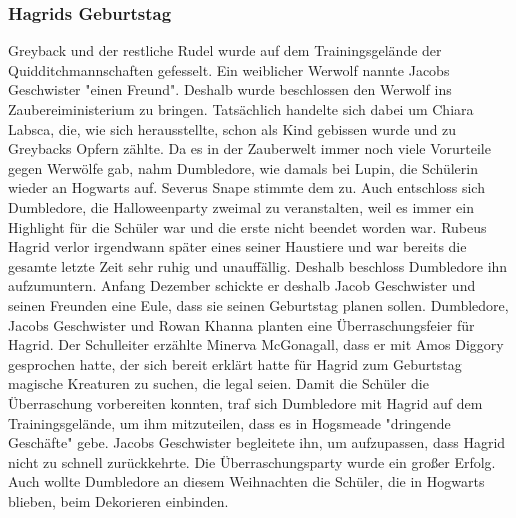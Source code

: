 \documentclass[a4paper, 10pt]{article}
\begin{document}
\subsubsection*{Hagrids Geburtstag}
Greyback und der restliche Rudel wurde auf dem Trainingsgelände der Quidditchmannschaften gefesselt. Ein weiblicher Werwolf nannte Jacobs Geschwister "einen Freund". Deshalb wurde beschlossen den Werwolf ins Zaubereiministerium zu bringen. Tatsächlich handelte sich dabei um Chiara Labsca, die, wie sich herausstellte, schon als Kind gebissen wurde und zu Greybacks Opfern zählte. Da es in der Zauberwelt immer noch viele Vorurteile gegen Werwölfe gab, nahm Dumbledore, wie damals bei Lupin, die Schülerin wieder an Hogwarts auf. Severus Snape stimmte dem zu. Auch entschloss sich Dumbledore, die Halloweenparty zweimal zu veranstalten, weil es immer ein Highlight für die Schüler war und die erste nicht beendet worden war.
\vspace{10pt}
\newline
Rubeus Hagrid verlor irgendwann später eines seiner Haustiere und war bereits die gesamte letzte Zeit sehr ruhig und unauffällig. Deshalb beschloss Dumbledore ihn aufzumuntern. Anfang Dezember schickte er deshalb Jacob Geschwister und seinen Freunden eine Eule, dass sie seinen Geburtstag planen sollen. Dumbledore, Jacobs Geschwister und Rowan Khanna planten eine Überraschungsfeier für Hagrid.
\vspace{10pt}
\newline
Der Schulleiter erzählte Minerva McGonagall, dass er mit Amos Diggory gesprochen hatte, der sich bereit erklärt hatte für Hagrid zum Geburtstag magische Kreaturen zu suchen, die legal seien. Damit die Schüler die Überraschung vorbereiten konnten, traf sich Dumbledore mit Hagrid auf dem Trainingsgelände, um ihm mitzuteilen, dass es in Hogsmeade "dringende Geschäfte" gebe. Jacobs Geschwister begleitete ihn, um aufzupassen, dass Hagrid nicht zu schnell zurückkehrte. Die Überraschungsparty wurde ein großer Erfolg.
\vspace{10pt}
\newline
Auch wollte Dumbledore an diesem Weihnachten die Schüler, die in Hogwarts blieben, beim Dekorieren einbinden.
\end{document}
